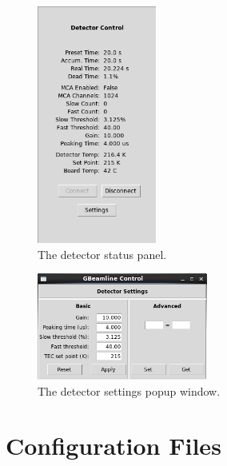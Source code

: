 \begin{figure}
\centering
\includegraphics[width=0.35\textwidth]{detctl.png}
\caption{\label{fig:detctl} The detector status panel.}
\end{figure}

\begin{figure}
\centering
\includegraphics[width=0.5\textwidth]{detsettings.png}
\caption{\label{fig:detsettings} The detector settings popup window.}
\end{figure}

\section{Configuration Files}
